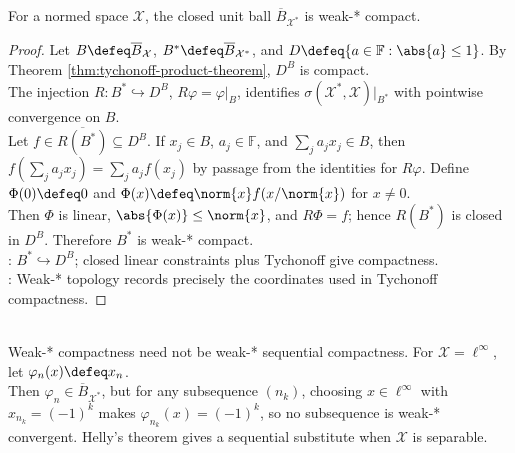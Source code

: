 \begin{theorem} \label{thm:banach-alaoglu} \\
For a normed space $\mathcal{X}$, the closed unit ball $\overline{B}_{\mathcal{X}^*}$ is weak-* compact.
\begin{proof} Let $B\defeq\overline{B}_{\mathcal{X}}$, $B^*\defeq\overline{B}_{\mathcal{X}^*}$, and $D\defeq\{a\in\mathbb{F}:\abs{a}\leq1\}$. By Theorem \ref{thm:tychonoff-product-theorem}, $D^B$ is compact.\\
The injection $R:B^*\hookrightarrow D^B$, $R\varphi=\varphi|_B$, identifies $\sigma(\mathcal{X}^*,\mathcal{X})|_{B^*}$ with pointwise convergence on $B$.\\
Let $f\in\overline{R(B^*)}\subseteq D^B$. If $x_j\in B$, $a_j\in\mathbb{F}$, and $\sum_j a_jx_j\in B$, then $f(\sum_j a_jx_j)=\sum_j a_jf(x_j)$ by passage from the identities for $R\varphi$. Define $\Phi(0)\defeq0$ and $\Phi(x)\defeq\norm{x}f(x/\norm{x})$ for $x\neq0$.\\
Then $\Phi$ is linear, $\abs{\Phi(x)}\leq\norm{x}$, and $R\Phi=f$; hence $R(B^*)$ is closed in $D^B$. Therefore $B^*$ is weak-* compact.\\
: $B^*\hookrightarrow D^B$; closed linear constraints plus Tychonoff give compactness.\\
: Weak-* topology records precisely the coordinates used in Tychonoff compactness.
\end{proof}
\end{theorem}

\begin{remark} \label{rem:weak-compactness-versus-sequences} \\
Weak-* compactness need not be weak-* sequential compactness. For $\mathcal{X}=\ell^\infty$, let $\varphi_n(x)\defeq x_n$.\\
Then $\varphi_n\in\overline{B}_{\mathcal{X}^*}$, but for any subsequence $(n_k)$, choosing $x\in\ell^\infty$ with $x_{n_k}=(-1)^k$ makes $\varphi_{n_k}(x)=(-1)^k$, so no subsequence is weak-* convergent. Helly's theorem gives a sequential substitute when $\mathcal{X}$ is separable.
\end{remark}

